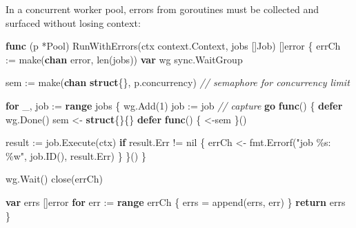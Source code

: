 \documentclass[
]{article}
\newenvironment{Shaded}{}{}
\newcommand{\BuiltInTok}[1]{\textcolor[rgb]{0.00,0.50,0.00}{#1}}
\newcommand{\CommentTok}[1]{\textcolor[rgb]{0.38,0.63,0.69}{\textit{#1}}}
\newcommand{\ControlFlowTok}[1]{\textcolor[rgb]{0.00,0.44,0.13}{\textbf{#1}}}
\newcommand{\DataTypeTok}[1]{\textcolor[rgb]{0.56,0.13,0.00}{#1}}
\newcommand{\DecValTok}[1]{\textcolor[rgb]{0.25,0.63,0.44}{#1}}
\newcommand{\KeywordTok}[1]{\textcolor[rgb]{0.00,0.44,0.13}{\textbf{#1}}}
\newcommand{\NormalTok}[1]{#1}
\newcommand{\OperatorTok}[1]{\textcolor[rgb]{0.40,0.40,0.40}{#1}}
\newcommand{\OtherTok}[1]{\textcolor[rgb]{0.00,0.44,0.13}{#1}}
\newcommand{\StringTok}[1]{\textcolor[rgb]{0.25,0.44,0.63}{#1}}
\begin{document}
In a concurrent worker pool, errors from goroutines must be collected
and surfaced without losing context:

\begin{Shaded}
\begin{Highlighting}[]
\KeywordTok{func} \OperatorTok{(}\NormalTok{p }\OperatorTok{*}\NormalTok{Pool}\OperatorTok{)}\NormalTok{ RunWithErrors}\OperatorTok{(}\NormalTok{ctx context}\OperatorTok{.}\NormalTok{Context}\OperatorTok{,}\NormalTok{ jobs }\OperatorTok{[]}\NormalTok{Job}\OperatorTok{)} \OperatorTok{[]}\DataTypeTok{error} \OperatorTok{\{}
\NormalTok{    errCh }\OperatorTok{:=} \BuiltInTok{make}\OperatorTok{(}\KeywordTok{chan} \DataTypeTok{error}\OperatorTok{,} \BuiltInTok{len}\OperatorTok{(}\NormalTok{jobs}\OperatorTok{))}
    \KeywordTok{var}\NormalTok{ wg sync}\OperatorTok{.}\NormalTok{WaitGroup}

\NormalTok{    sem }\OperatorTok{:=} \BuiltInTok{make}\OperatorTok{(}\KeywordTok{chan} \KeywordTok{struct}\OperatorTok{\{\},}\NormalTok{ p}\OperatorTok{.}\NormalTok{concurrency}\OperatorTok{)} \CommentTok{// semaphore for concurrency limit}

    \ControlFlowTok{for}\NormalTok{ \_}\OperatorTok{,}\NormalTok{ job }\OperatorTok{:=} \KeywordTok{range}\NormalTok{ jobs }\OperatorTok{\{}
\NormalTok{        wg}\OperatorTok{.}\NormalTok{Add}\OperatorTok{(}\DecValTok{1}\OperatorTok{)}
\NormalTok{        job }\OperatorTok{:=}\NormalTok{ job }\CommentTok{// capture}
        \ControlFlowTok{go} \KeywordTok{func}\OperatorTok{()} \OperatorTok{\{}
            \ControlFlowTok{defer}\NormalTok{ wg}\OperatorTok{.}\NormalTok{Done}\OperatorTok{()}
\NormalTok{            sem }\OperatorTok{\textless{}{-}} \KeywordTok{struct}\OperatorTok{\{\}\{\}}
            \ControlFlowTok{defer} \KeywordTok{func}\OperatorTok{()} \OperatorTok{\{} \OperatorTok{\textless{}{-}}\NormalTok{sem }\OperatorTok{\}()}

\NormalTok{            result }\OperatorTok{:=}\NormalTok{ job}\OperatorTok{.}\NormalTok{Execute}\OperatorTok{(}\NormalTok{ctx}\OperatorTok{)}
            \ControlFlowTok{if}\NormalTok{ result}\OperatorTok{.}\NormalTok{Err }\OperatorTok{!=} \OtherTok{nil} \OperatorTok{\{}
\NormalTok{                errCh }\OperatorTok{\textless{}{-}}\NormalTok{ fmt}\OperatorTok{.}\NormalTok{Errorf}\OperatorTok{(}\StringTok{"job \%s: \%w"}\OperatorTok{,}\NormalTok{ job}\OperatorTok{.}\NormalTok{ID}\OperatorTok{(),}\NormalTok{ result}\OperatorTok{.}\NormalTok{Err}\OperatorTok{)}
            \OperatorTok{\}}
        \OperatorTok{\}()}
    \OperatorTok{\}}

\NormalTok{    wg}\OperatorTok{.}\NormalTok{Wait}\OperatorTok{()}
    \BuiltInTok{close}\OperatorTok{(}\NormalTok{errCh}\OperatorTok{)}

    \KeywordTok{var}\NormalTok{ errs }\OperatorTok{[]}\DataTypeTok{error}
    \ControlFlowTok{for}\NormalTok{ err }\OperatorTok{:=} \KeywordTok{range}\NormalTok{ errCh }\OperatorTok{\{}
\NormalTok{        errs }\OperatorTok{=} \BuiltInTok{append}\OperatorTok{(}\NormalTok{errs}\OperatorTok{,}\NormalTok{ err}\OperatorTok{)}
    \OperatorTok{\}}
    \ControlFlowTok{return}\NormalTok{ errs}
\OperatorTok{\}}
\end{Highlighting}
\end{Shaded}
\end{document}
